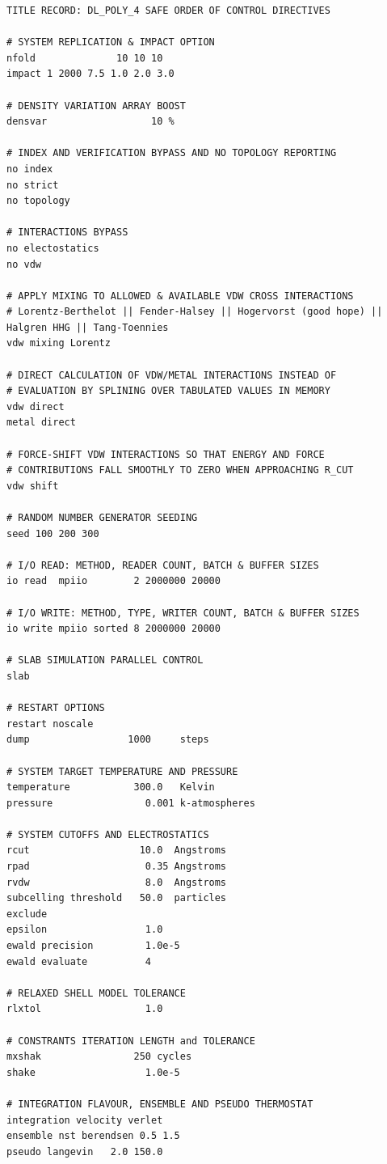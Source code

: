 \begin{lstlisting}
TITLE RECORD: DL_POLY_4 SAFE ORDER OF CONTROL DIRECTIVES

# SYSTEM REPLICATION & IMPACT OPTION
nfold              10 10 10
impact 1 2000 7.5 1.0 2.0 3.0

# DENSITY VARIATION ARRAY BOOST
densvar                  10 %

# INDEX AND VERIFICATION BYPASS AND NO TOPOLOGY REPORTING
no index
no strict
no topology

# INTERACTIONS BYPASS
no electostatics
no vdw

# APPLY MIXING TO ALLOWED & AVAILABLE VDW CROSS INTERACTIONS
# Lorentz-Berthelot || Fender-Halsey || Hogervorst (good hope) || Halgren HHG || Tang-Toennies
vdw mixing Lorentz

# DIRECT CALCULATION OF VDW/METAL INTERACTIONS INSTEAD OF
# EVALUATION BY SPLINING OVER TABULATED VALUES IN MEMORY
vdw direct
metal direct

# FORCE-SHIFT VDW INTERACTIONS SO THAT ENERGY AND FORCE
# CONTRIBUTIONS FALL SMOOTHLY TO ZERO WHEN APPROACHING R_CUT
vdw shift

# RANDOM NUMBER GENERATOR SEEDING
seed 100 200 300

# I/O READ: METHOD, READER COUNT, BATCH & BUFFER SIZES
io read  mpiio        2 2000000 20000

# I/O WRITE: METHOD, TYPE, WRITER COUNT, BATCH & BUFFER SIZES
io write mpiio sorted 8 2000000 20000

# SLAB SIMULATION PARALLEL CONTROL
slab

# RESTART OPTIONS
restart noscale
dump                 1000     steps

# SYSTEM TARGET TEMPERATURE AND PRESSURE
temperature           300.0   Kelvin
pressure                0.001 k-atmospheres

# SYSTEM CUTOFFS AND ELECTROSTATICS
rcut                   10.0  Angstroms
rpad                    0.35 Angstroms
rvdw                    8.0  Angstroms
subcelling threshold   50.0  particles
exclude
epsilon                 1.0
ewald precision         1.0e-5
ewald evaluate          4

# RELAXED SHELL MODEL TOLERANCE
rlxtol                  1.0

# CONSTRANTS ITERATION LENGTH and TOLERANCE
mxshak                250 cycles
shake                   1.0e-5

# INTEGRATION FLAVOUR, ENSEMBLE AND PSEUDO THERMOSTAT
integration velocity verlet
ensemble nst berendsen 0.5 1.5
pseudo langevin   2.0 150.0


\end{lstlisting}
